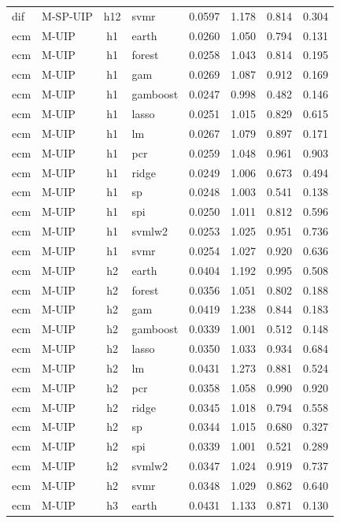 \begin{ThreePartTable}
\begin{longtable}[t]{llclcccc}
dif & M-SP-UIP & h12 & svmr & 0.0597 & 1.178 & 0.814 & 0.304\\
\addlinespace
ecm & M-UIP & h1 & earth & 0.0260 & 1.050 & 0.794 & 0.131\\
ecm & M-UIP & h1 & forest & 0.0258 & 1.043 & 0.814 & 0.195\\
ecm & M-UIP & h1 & gam & 0.0269 & 1.087 & 0.912 & 0.169\\
ecm & M-UIP & h1 & gamboost & 0.0247 & 0.998 & 0.482 & 0.146\\
ecm & M-UIP & h1 & lasso & 0.0251 & 1.015 & 0.829 & 0.615\\
ecm & M-UIP & h1 & lm & 0.0267 & 1.079 & 0.897 & 0.171\\
ecm & M-UIP & h1 & pcr & 0.0259 & 1.048 & 0.961 & 0.903\\
ecm & M-UIP & h1 & ridge & 0.0249 & 1.006 & 0.673 & 0.494\\
ecm & M-UIP & h1 & sp & 0.0248 & 1.003 & 0.541 & 0.138\\
ecm & M-UIP & h1 & spi & 0.0250 & 1.011 & 0.812 & 0.596\\
ecm & M-UIP & h1 & svmlw2 & 0.0253 & 1.025 & 0.951 & 0.736\\
ecm & M-UIP & h1 & svmr & 0.0254 & 1.027 & 0.920 & 0.636\\
\addlinespace
ecm & M-UIP & h2 & earth & 0.0404 & 1.192 & 0.995 & 0.508\\
ecm & M-UIP & h2 & forest & 0.0356 & 1.051 & 0.802 & 0.188\\
ecm & M-UIP & h2 & gam & 0.0419 & 1.238 & 0.844 & 0.183\\
ecm & M-UIP & h2 & gamboost & 0.0339 & 1.001 & 0.512 & 0.148\\
ecm & M-UIP & h2 & lasso & 0.0350 & 1.033 & 0.934 & 0.684\\
ecm & M-UIP & h2 & lm & 0.0431 & 1.273 & 0.881 & 0.524\\
ecm & M-UIP & h2 & pcr & 0.0358 & 1.058 & 0.990 & 0.920\\
ecm & M-UIP & h2 & ridge & 0.0345 & 1.018 & 0.794 & 0.558\\
ecm & M-UIP & h2 & sp & 0.0344 & 1.015 & 0.680 & 0.327\\
ecm & M-UIP & h2 & spi & 0.0339 & 1.001 & 0.521 & 0.289\\
ecm & M-UIP & h2 & svmlw2 & 0.0347 & 1.024 & 0.919 & 0.737\\
ecm & M-UIP & h2 & svmr & 0.0348 & 1.029 & 0.862 & 0.640\\
\addlinespace
ecm & M-UIP & h3 & earth & 0.0431 & 1.133 & 0.871 & 0.130\\

\end{longtable}
\end{ThreePartTable}
